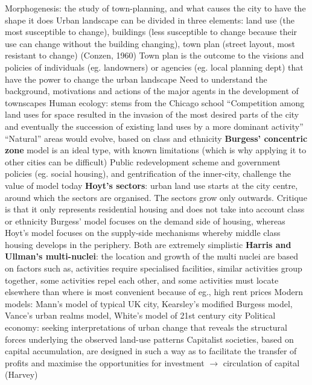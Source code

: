 \documentclass{article}
\begin{document}
\begin{outline}
	\1 Morphogenesis: the study of town-planning, and what causes the city to have the shape it does
		\2 Urban landscape can be divided in three elements: land use (the most susceptible to change), buildings (less susceptible to change because their use can change without the building changing), town plan (street layout, most resistant to change) (Conzen, 1960)
		\2 Town plan is the outcome to the visions and policies of individuals (eg. landowners) or agencies (eg. local planning dept) that have the power to change the urban landscape
		\2 Need to understand the background, motivations and actions of the major agents in the development of townscapes
	\1 Human ecology: stems from the Chicago school
		\2 ``Competition among land uses for space resulted in the invasion of the most desired parts of the city and eventually the succession of existing land uses by a more dominant activity''
		\2 ``Natural'' areas would evolve, based on class and ethnicity 
		\2 \textbf{Burgess' concentric zone} model is an ideal type, with known limitations (which is why applying it to other cities can be difficult)
		\2 Public redevelopment scheme and government policies (eg. social housing), and gentrification of the inner-city, challenge the value of model today
		\2 \textbf{Hoyt's sectors}: urban land use starts at the city centre, around which the sectors are organised. The sectors grow only outwards. Critique is that it only represents residential housing and does not take into account class or ethnicity
		\2 Burgess' model focuses on the demand side of housing, whereas Hoyt's model focuses on the supply-side mechanisms whereby middle class housing develops in the periphery. Both are extremely simplistic
		\2 \textbf{Harris and Ullman's multi-nuclei}: the location and growth of the multi nuclei are based on factors such as, activities require specialised facilities, similar activities group together, some activities repel each other, and some activities must locate elsewhere than where is most convenient because of eg., high rent prices
		\2 Modern models: Mann's model of typical UK city, Kearsley's modified Burgess model, Vance's urban realms model, White's model of 21st century city
	\1 Political economy: seeking interpretations of urban change that reveals the structural forces underlying the observed land-use patterns
		\2 Capitalist societies, based on capital accumulation, are designed in such a way as to facilitate the transfer of profits and maximise the opportunities for investment $\rightarrow$ circulation of capital (Harvey)

\end{outline}
\end{document}

